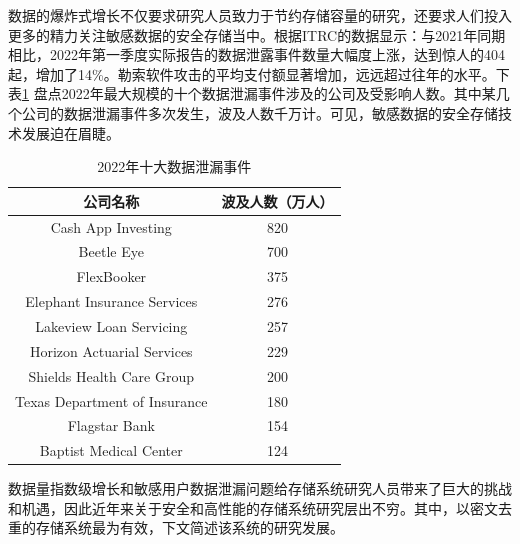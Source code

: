 \documentclass[promaster]{thesis-uestc}
\begin{document}
数据的爆炸式增长不仅要求研究人员致力于节约存储容量的研究，还要求人们投入更多的精力关注敏感数据的安全存储当中。根据\acrlong{ITRC}的数据显示：与2021年同期相比，2022年第一季度实际报告的数据泄露事件数量大幅度上涨，达到惊人的404起，增加了14\%。勒索软件攻击的平均支付额显著增加，远远超过往年的水平。下表\ref{2022年十大数据泄漏事件}
盘点2022年最大规模的十个数据泄漏事件涉及的公司及受影响人数。其中某几个公司的数据泄漏事件多次发生，波及人数千万计。可见，敏感数据的安全存储技术发展迫在眉睫。

\begin{table}[htbp]
    \begin{center}
        \caption{2022年十大数据泄漏事件}
        \label{2022年十大数据泄漏事件}
        \begin{tabular}{|c|c|}
            \hline
            \textbf{公司名称}                 & \textbf{波及人数（万人）} \\
            \hline
            Cash App Investing            & 820               \\
            \hline
            Beetle Eye                    & 700               \\
            \hline
            FlexBooker                    & 375               \\
            \hline
            Elephant Insurance Services   & 276               \\
            \hline
            Lakeview Loan Servicing       & 257               \\
            \hline
            Horizon Actuarial Services    & 229               \\
            \hline
            Shields Health Care Group     & 200               \\
            \hline
            Texas Department of Insurance & 180               \\
            \hline
            Flagstar Bank                 & 154               \\
            \hline
            Baptist Medical Center        & 124               \\
            \hline
        \end{tabular}
    \end{center}
\end{table}

数据量指数级增长和敏感用户数据泄漏问题给存储系统研究人员带来了巨大的挑战和机遇，因此近年来关于安全和高性能的存储系统研究层出不穷。其中，以密文去重的存储系统最为有效，下文简述该系统的研究发展。
\end{document}
